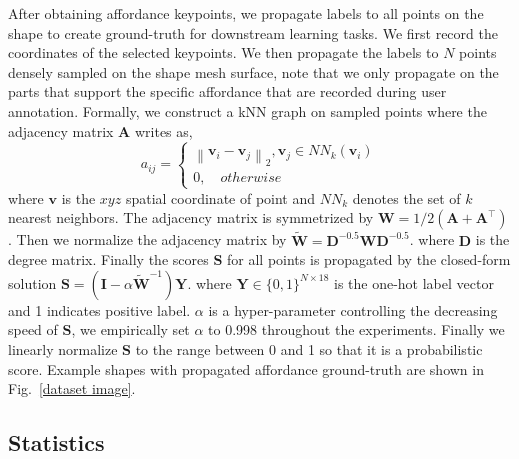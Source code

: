 \documentclass[final]{cvpr}
\newcommand{\vect}[1]{\mathbf{#1}}
\newcommand{\matr}[1]{\mathbf{#1}}
\begin{document}
After obtaining affordance keypoints, we propagate labels to all points on the shape to create ground-truth for downstream learning tasks. We first record the coordinates of the selected keypoints. We then propagate the labels to $N$ points densely sampled on the shape mesh surface, note that we only propagate on the parts that support
the specific affordance that are recorded during user annotation. Formally, we construct a kNN graph on sampled points where the adjacency matrix $\matr{A}$ writes as,
\begin{equation}
   a_{ij}=\left\{\begin{matrix}
      \left \| \vect{v}_{i}-\vect{v}_{j} \right \|_{2},\vect{v}_{j}\in NN_{k}(\vect{v}_{i}) \\
      0, \quad otherwise
   \end{matrix}\right.
   \label{math3}
\end{equation}
where $\vect{v}$ is the $xyz$ spatial coordinate of point and $NN_{k}$ denotes the set of $k$ nearest neighbors. The adjacency matrix is symmetrized by $\matr{W}=1/2(\matr{A}+\matr{A}^\top)$. Then we normalize the adjacency matrix by $\widetilde{\matr{W}}=\matr{D}^{-0.5}\matr{W}\matr{D}^{-0.5}$.
where $\matr{D}$ is the degree matrix.
Finally the scores $\matr{S}$ for all points is propagated by the closed-form solution $\matr{S}=(\matr{I}-\alpha \widetilde{\matr{W}}^{-1})\matr{Y}$.
where $\matr{Y}\in \{0,1\}^{N\times 18}$ is the one-hot label vector and 1 indicates positive label. $\alpha$ is a hyper-parameter controlling
the decreasing speed of $\matr{S}$, we empirically set $\alpha$ to 0.998 throughout the experiments. Finally we linearly normalize $\matr{S}$ to the range between 0 and 1 so that it is a probabilistic score. Example shapes with propagated affordance ground-truth are shown in Fig.~\ref{dataset image}.





\subsection{Statistics}
\end{document}
